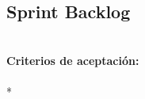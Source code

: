 \subsection{Sprint Backlog}
	{} %
	{	\\
	\textbf{Criterios de aceptación:}\\
  	\\
	* \\
	} %
	{} %
	{} %
	{} %
	{} %
	{} %

	\task	{} %
		{} %
		{\\
		} %
		{} %
		{} %
		{} %
		{} %

\vspace{20pt}

